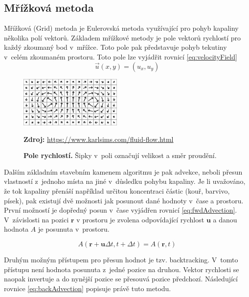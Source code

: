 \subsection{Mřížková metoda}
\label{chapter:Grid}
Mřížková (Grid) metoda je Eulerovská metoda využívající pro pohyb kapaliny několika polí vektorů. Základem mřížkové metody je pole vektorů rychlostí pro každý zkoumaný bod v~mřížce. Toto pole pak představuje pohyb tekutiny v~celém zkoumaném prostoru. Toto pole lze vyjádřit rovnicí \ref{eq:velocityField}
\begin{equation}
	\Vec{u}(x,y) = (u_x,u_y)
	\label{eq:velocityField}
\end{equation}

\begin{figure}[hbt]
	\centering
	\includegraphics[width=0.45\textwidth]{obrazky-figures/flow-field.png}
	\caption{\textbf{Pole rychlostí.} Šipky v~poli označují velikost a směr proudění.}
	\textbf{Zdroj: } \url{https://www.karlsims.com/fluid-flow.html}
	\label{fig:VelocityField}
\end{figure}

Dalším základním stavebním kamenem algoritmu je pak advekce, neboli přesun vlastností z~jednoho místa na jiné v~důsledku pohybu kapaliny. Je li uvažováno, že tok kapaliny přenáší například určitou koncentraci částic (kouř, barvivo, písek), pak existují dvě možnosti jak posunout dané hodnoty v~čase a prostoru.  První možností je dopředný posun v~čase vyjádřen rovnicí \ref{eq:fwdAdvection}. V~závislosti na pozici $\mathbf{r}$ v prostoru je zvolena odpovídající rychlost $\mathbf{u}$ a danou hodnota $A$ je posunuta v~prostoru.

\begin{equation}
	A(\mathbf{r} + \mathbf{u}\Delta t, t + \Delta t) = A(\mathbf{r}, t)
	\label{eq:fwdAdvection}
\end{equation}

Druhým možným přístupem pro přesun hodnot je tzv. backtracking. V~tomto přístupu není hodnota posunuta z~jedné pozice na druhou. Vektor rychlosti se naopak invertuje a do nynější pozice se přesouvá pozice předchozí. Následující rovnice \ref{eq:backAdvection} popisuje právě tuto metodu. \cite{webglFluid}

